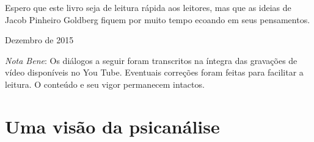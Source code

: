 Espero que este livro seja de leitura rápida aos leitores, mas que as
ideias de Jacob Pinheiro Goldberg fiquem por muito tempo ecoando em seus
pensamentos.

\smallskip{} 

\hfill {}Dezembro de 2015

\vfill

\emph{Nota Bene}: Os diálogos a seguir foram transcritos na íntegra das
gravações de vídeo disponíveis no You Tube. Eventuais correções foram
feitas para facilitar a leitura. O conteúdo e seu vigor
permanecem intactos.

\part{Uma visão da psicanálise} 
